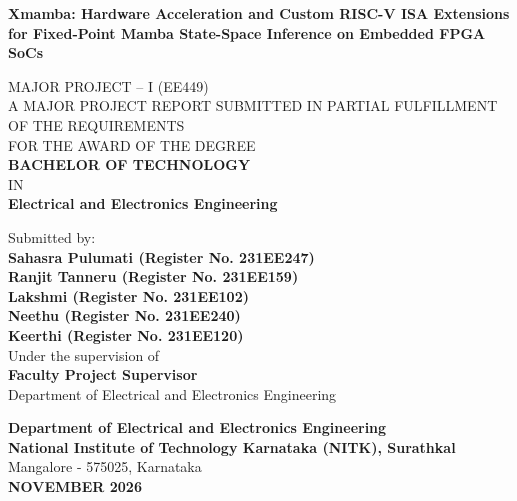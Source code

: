 \documentclass[11pt,a4paper,oneside]{report}
\begin{document}
\begingroup
\linespread{1.2}\selectfont
\begin{center}
{\Large \textbf{Xmamba: Hardware Acceleration and Custom RISC-V ISA Extensions for Fixed-Point Mamba State-Space Inference on Embedded FPGA SoCs}}\\
\vspace{0.6cm}

MAJOR PROJECT -- I (EE449)\\
\vspace{0.8cm}
A MAJOR PROJECT REPORT SUBMITTED IN PARTIAL FULFILLMENT OF THE REQUIREMENTS\\
FOR THE AWARD OF THE DEGREE\\
\vspace{0.5cm}
\textbf{BACHELOR OF TECHNOLOGY}\\
IN\\
\textbf{Electrical and Electronics Engineering}\\
\vspace{0.8cm}

Submitted by:\\
\textbf{Sahasra Pulumati (Register No. 231EE247)}\\
\textbf{Ranjit Tanneru (Register No. 231EE159)}\\
\textbf{Lakshmi (Register No. 231EE102)}\\
\textbf{Neethu (Register No. 231EE240)}\\
\textbf{Keerthi (Register No. 231EE120)}\\

\vspace{0.8cm}
Under the supervision of\\
\textbf{Faculty Project Supervisor}\\
Department of Electrical and Electronics Engineering\\
\end{center}

\vfill
\begin{center}
\vspace{0.5cm}
\textbf{Department of Electrical and Electronics Engineering}\\
\textbf{National Institute of Technology Karnataka (NITK), Surathkal}\\
Mangalore - 575025, Karnataka\\
\textbf{NOVEMBER 2026}
\end{center}
\thispagestyle{empty}
\endgroup
\clearpage
\end{document}
